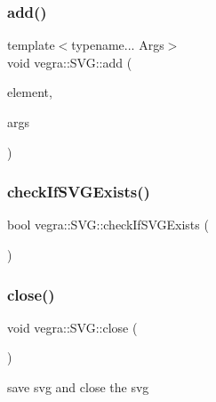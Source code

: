 \subsubsection{\texorpdfstring{add()}{add()}\hspace{0.1cm}{\footnotesize\ttfamily [3/3]}}
{\footnotesize\ttfamily template$<$typename... Args$>$ \\
void vegra\+::\+S\+V\+G\+::add (\begin{DoxyParamCaption}\item[{\mbox{\hyperlink{structvegra_1_1SVGElement}{vegra\+::\+S\+V\+G\+Element}} $\ast$}]{element,  }\item[{Args...}]{args }\end{DoxyParamCaption})\hspace{0.3cm}{\ttfamily [inline]}}

\mbox{\label{structvegra_1_1SVG_a185b8b4ad59002b8fc921a288f69f9d9}} 
\subsubsection{\texorpdfstring{check\+If\+S\+V\+G\+Exists()}{checkIfSVGExists()}}
{\footnotesize\ttfamily bool vegra\+::\+S\+V\+G\+::check\+If\+S\+V\+G\+Exists (\begin{DoxyParamCaption}{ }\end{DoxyParamCaption})\hspace{0.3cm}{\ttfamily [inline]}}

\mbox{\label{structvegra_1_1SVG_a90d8788e7776685d3da401ce8a9a8596}} 
\subsubsection{\texorpdfstring{close()}{close()}}
{\footnotesize\ttfamily void vegra\+::\+S\+V\+G\+::close (\begin{DoxyParamCaption}{ }\end{DoxyParamCaption})\hspace{0.3cm}{\ttfamily [inline]}}



save svg and close the svg 

